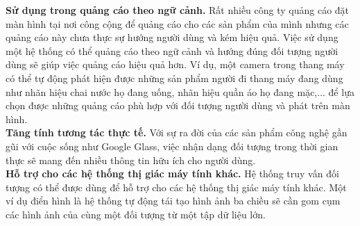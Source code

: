 \textbf{Sử dụng trong quảng cáo theo ngữ cảnh.} Rất nhiều công ty quảng cáo đặt màn hình tại nơi công cộng để quảng cáo cho các sản phẩm của mình nhưng các quảng cáo này chưa thực sự hướng người dùng và kém hiệu quả. Việc sử dụng một hệ thống có thể quảng cáo theo ngữ cảnh và hướng đúng đối tượng người dùng sẽ giúp việc quảng cáo hiệu quả hơn. Ví dụ, một camera trong thang máy có thể tự động phát hiện được những sản phẩm người đi thang máy đang dùng như nhãn hiệu chai nước họ đang uống, nhãn hiệu quần áo họ đang mặc,... để lựa chọn được những quảng cáo phù hợp với đối tượng người dùng và phát trên màn hình.\\
\textbf{Tăng tính tương tác thực tế.} Với sự ra đời của các sản phẩm công nghệ gần gũi với cuộc sống như Google Glass, việc nhận dạng đối tượng trong thời gian thực sẽ mang đến nhiều thông tin hữu ích cho người dùng.\\
\textbf{Hỗ trợ cho các hệ thống thị giác máy tính khác.} Hệ thống truy vấn đối tượng có thể được dùng để hỗ trợ cho các hệ thống thị giác máy tính khác. Một ví dụ điển hình là hệ thống tự động tái tạo hình ảnh ba chiều sẽ cần gom cụm các hình ảnh của cùng một đối tượng từ một tập dữ liệu lớn.\\


%
%

